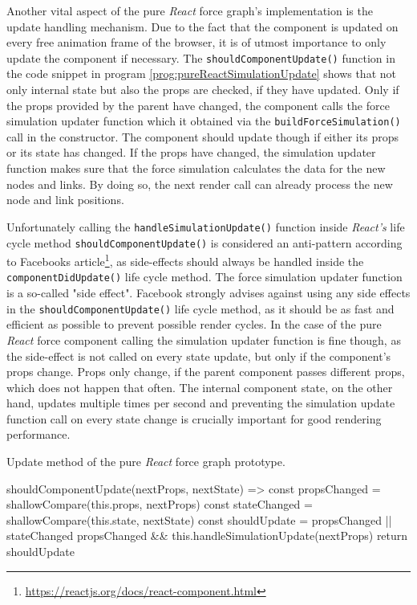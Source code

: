 Another vital aspect of the pure \emph{React} force graph's implementation is the update handling mechanism. Due to the fact that the component is updated on every free animation frame of the browser, it is of utmost importance to only update the component if necessary. The \texttt{shouldComponentUpdate()} function in the code snippet in program \ref{prog:pureReactSimulationUpdate} shows that not only internal state but also the props are checked, if they have updated. Only if the props provided by the parent have changed, the component calls the force simulation updater function which it obtained via the \texttt{buildForceSimulation()} call in the constructor. The component should update though if either its props or its state has changed. If the props have changed, the simulation updater function makes sure that the force simulation calculates the data for the new nodes and links. By doing so, the next render call can already process the new node and link positions.

Unfortunately calling the \texttt{handleSimulationUpdate()} function inside \emph{React's} life cycle method \texttt{should\linebreak[0]{}Component\linebreak[0]{}Update()} is considered an anti-pattern according to Facebooks article\footnote{\url{https://reactjs.org/docs/react-component.html}}, as side-effects should always be handled inside the \texttt{component\linebreak[0]{}Did\linebreak[0]{}Update()} life cycle method. The force simulation updater function is a so-called "side effect". Facebook strongly advises against using any side effects in the \texttt{should\linebreak[0]{}Component\linebreak[0]{}Update()} life cycle method, as it should be as fast and efficient as possible to prevent possible render cycles. In the case of the pure \emph{React} force component calling the simulation updater function is fine though, as the side-effect is not called on every state update, but only if the component's props change. Props only change, if the parent component passes different props, which does not happen that often. The internal component state, on the other hand, updates multiple times per second and preventing the simulation update function call on every state change is crucially important for good rendering performance.

\begin{program}
\caption{Update method of the pure \emph{React} force graph prototype.}
\label{prog:pureReactSimulationUpdate}
\begin{JsCode}
shouldComponentUpdate(nextProps, nextState) => {
  const propsChanged = shallowCompare(this.props, nextProps)
  const stateChanged = shallowCompare(this.state, nextState)
  const shouldUpdate = propsChanged || stateChanged
  propsChanged && this.handleSimulationUpdate(nextProps)
  return shouldUpdate
}
\end{JsCode}
\end{program}

